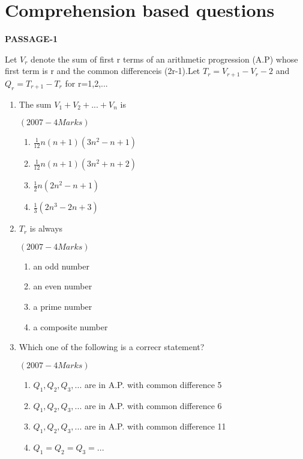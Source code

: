 \documentclass[journal,12pt,twocolumn]{IEEEtran}
\theoremstyle{remark}
\begin{document}
\section*{Comprehension based questions}
    \begin{center}    
      \textbf{PASSAGE-1}
    \end{center}
 Let $ V_r $ denote the sum of first r terms of an arithmetic progression (A.P) whose first term is r and the common differenceis (2r-1).Let $ T_r=V_{r+1}-V_r-2 $ and $ Q_r=T_{r+1}-T_r$ for r=1,2,...
 \\ 
 \begin{enumerate}

 \item The sum $ V_1+V_2+...+V_n $ is 
	 \begin{flushright}                             $(2007 -4 Marks)$                              \end{flushright}
  \begin{enumerate}
	\item $\frac{1}{12}n(n+1)(3n^2-n+1)$
	\item $\frac{1}{12}n(n+1)(3n^2+n+2)$
	\item $\frac{1}{2}n(2n^2-n+1)$
	\item $\frac{1}{3}(2n^3-2n+3)$
    \end{enumerate} 

  \item $T_r$ is always 
\begin{flushright}                                 $(2007 -4 Marks)$                                  \end{flushright}

	  \begin{enumerate} 
	\item an odd number 
	\item an even number
	\item a prime number 
	\item a composite number 
	  \end{enumerate}
    \item Which one of the following is a correcr statement? 
	    \begin{flushright}                                 $(2007 -4 Marks)$                                  \end{flushright}
     \begin{enumerate}
	\item $Q_1,Q_2,Q_3,...$ are in A.P. with common difference 5 
	\item $Q_1,Q_2,Q_3,...$ are in A.P. with common difference 6
	\item $Q_1,Q_2,Q_3,...$ are in A.P. with common difference 11
	\item $Q_1=Q_2=Q_3=...$
     \end{enumerate}



 \end{enumerate}

	






    
\end{document}
